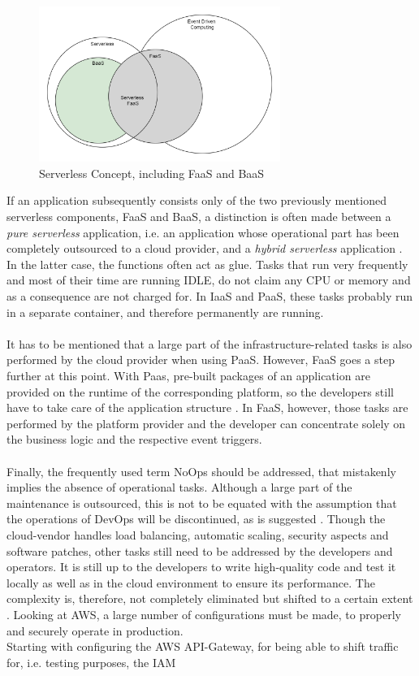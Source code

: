 \documentclass[a4paper,twoside,11pt, pagesize]{scrartcl}
\begin{document}
\begin{figure}[H]
\caption{Serverless Concept, including FaaS and BaaS}
\label{fig:serverlessBaaSandPaas}
\centering
\includegraphics[width=0.7\textwidth]{Serverless}
\end{figure} 
If an application subsequently consists only of the two previously mentioned serverless components, FaaS and BaaS, a distinction is often made between a \textit{pure serverless} application, i.e. an application whose operational part has been completely outsourced to a cloud provider, and a \textit{hybrid serverless} application \cite{leitner2019mixed}. In the latter case, the functions often act as glue. Tasks that run very frequently and most of their time are running IDLE, do not claim any CPU or memory and as a consequence are not charged for. In IaaS and PaaS, these tasks probably run in a separate container, and therefore permanently are running.\\\\ It has to be mentioned that a large part of the infrastructure-related tasks is also performed by the cloud provider when using PaaS. However, FaaS goes a step further at this point. With Paas, pre-built packages of an application are provided on the runtime of the corresponding platform, so the developers still have to take care of the application structure \cite{kaplan2019framework}. In FaaS, however, those tasks are performed by the platform provider and the developer can concentrate solely on the business logic and the respective event triggers.\\\\ Finally, the frequently used term \glqq NoOps\grqq{} \cite{fowler2018serverless} should be addressed, that mistakenly implies the absence of operational tasks. Although a large part of the maintenance is outsourced, this is not to be equated with the assumption that the operations of DevOps will be discontinued, as is suggested \cite{fowler2018serverless}.  Though the cloud-vendor handles load balancing, automatic scaling, security aspects and software patches, other tasks still need to be addressed by the developers and operators. It is still up to the developers to write high-quality code and test it locally as well as in the cloud environment to ensure its performance. The complexity is, therefore, not completely eliminated but shifted to a certain extent \cite{eivy2017wary}. Looking at AWS, a large number of configurations must be made, to properly and securely operate in production.\\ Starting with configuring the AWS API-Gateway, for being able to shift traffic for, i.e. testing purposes, the IAM 
\end{document}
